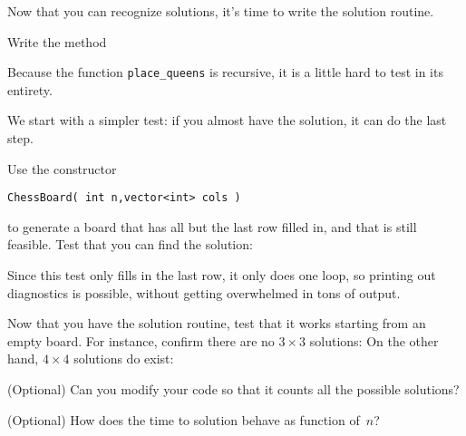 Now that you can recognize solutions, it's time to
write the solution routine.
\begin{exercise}
  Write the method 
\end{exercise}

Because the function \lstinline+place_queens+ is recursive,
it is a little hard to test in its entirety.

We start with a simpler test:
if you almost have the solution,
it can do the last step.

\begin{exercise}
  Use the constructor 
\begin{lstlisting}
ChessBoard( int n,vector<int> cols )
\end{lstlisting}
to generate a board that has all but the last row filled in,
and that is still feasible. Test that you can find the solution:
\end{exercise}

Since this test only fills in the last row,
it only does one loop,
so printing out diagnostics is possible,
without getting overwhelmed in tons of output.


Now that you have the solution routine,
test that it works starting from an empty board.
For instance, confirm there are no $3\times 3$ solutions:
On the other hand, $4\times4$ solutions do exist:

\begin{exercise}
  (Optional) Can you modify your code so that it counts all the possible
  solutions?
\end{exercise}

\begin{exercise}
  (Optional) How does the time to solution behave as function of~$n$?
\end{exercise}

